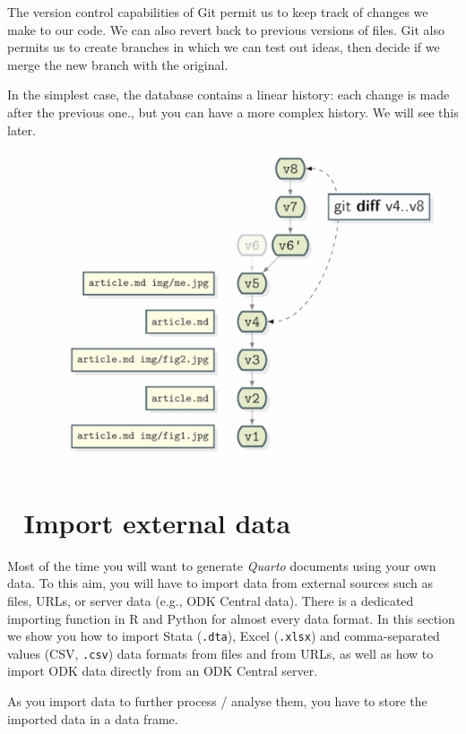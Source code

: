 \documentclass[
  letterpaper,
  DIV=11,
  numbers=noendperiod,
  oneside]{scrreprt}
\begin{document}
The version control capabilities of Git permit us to keep track of
changes we make to our code. We can also revert back to previous
versions of files. Git also permits us to create branches in which we
can test out ideas, then decide if we merge the new branch with the
original.

In the simplest case, the database contains a linear history: each
change is made after the previous one., but you can have a more complex
history. We will see this later.

\includegraphics{./images/paste-48384992.png}

\hypertarget{import-external-data}{%
\chapter{\texorpdfstring{{📘} Import external
data}{📘 Import external data}}\label{import-external-data}}

Most of the time you will want to generate \emph{Quarto} documents using
your own data. To this aim, you will have to import data from external
sources such as files, URLs, or server data (e.g., ODK Central data).
There is a dedicated importing function in R and Python for almost every
data format. In this section we show you how to import Stata
(\texttt{.dta}), Excel (\texttt{.xlsx}) and comma-separated values (CSV,
\texttt{.csv}) data formats from files and from URLs, as well as how to
import ODK data directly from an ODK Central server.

\begin{tcolorbox}[enhanced jigsaw, colbacktitle=quarto-callout-important-color!10!white, titlerule=0mm, breakable, opacityback=0, opacitybacktitle=0.6, left=2mm, coltitle=black, colback=white, title=\textcolor{quarto-callout-important-color}{\faExclamation}\hspace{0.5em}{Important}, rightrule=.15mm, colframe=quarto-callout-important-color-frame, toprule=.15mm, bottomtitle=1mm, toptitle=1mm, arc=.35mm, bottomrule=.15mm, leftrule=.75mm]
As you import data to further process / analyse them, you have to store
the imported data in a data frame.
\end{tcolorbox}
\end{document}
